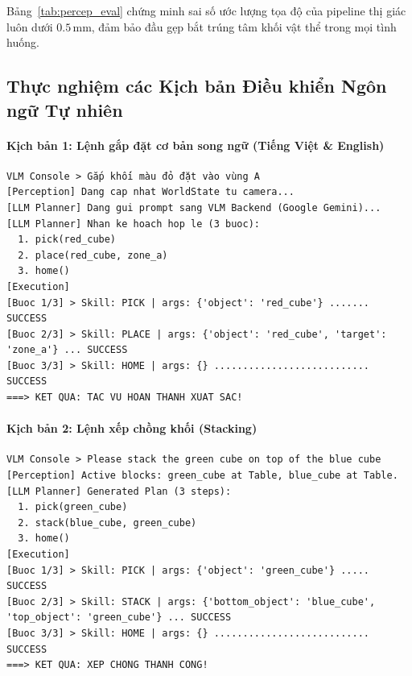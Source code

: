 \documentclass[a4paper,12pt]{article}
\begin{document}
Bảng~\ref{tab:percep_eval} chứng minh sai số ước lượng tọa độ của pipeline thị giác luôn dưới $0.5\,\text{mm}$, đảm bảo đầu gẹp bắt trúng tâm khối vật thể trong mọi tình huống.

\subsection{Thực nghiệm các Kịch bản Điều khiển Ngôn ngữ Tự nhiên}

\paragraph{Kịch bản 1: Lệnh gắp đặt cơ bản song ngữ (Tiếng Việt \& English)}
\begin{lstlisting}
VLM Console > Gắp khối màu đỏ đặt vào vùng A
[Perception] Dang cap nhat WorldState tu camera...
[LLM Planner] Dang gui prompt sang VLM Backend (Google Gemini)...
[LLM Planner] Nhan ke hoach hop le (3 buoc):
  1. pick(red_cube)
  2. place(red_cube, zone_a)
  3. home()
[Execution]
[Buoc 1/3] > Skill: PICK | args: {'object': 'red_cube'} ....... SUCCESS
[Buoc 2/3] > Skill: PLACE | args: {'object': 'red_cube', 'target': 'zone_a'} ... SUCCESS
[Buoc 3/3] > Skill: HOME | args: {} ........................... SUCCESS
===> KET QUA: TAC VU HOAN THANH XUAT SAC!
\end{lstlisting}

\paragraph{Kịch bản 2: Lệnh xếp chồng khối (Stacking)}
\begin{lstlisting}
VLM Console > Please stack the green cube on top of the blue cube
[Perception] Active blocks: green_cube at Table, blue_cube at Table.
[LLM Planner] Generated Plan (3 steps):
  1. pick(green_cube)
  2. stack(blue_cube, green_cube)
  3. home()
[Execution]
[Buoc 1/3] > Skill: PICK | args: {'object': 'green_cube'} ..... SUCCESS
[Buoc 2/3] > Skill: STACK | args: {'bottom_object': 'blue_cube', 'top_object': 'green_cube'} ... SUCCESS
[Buoc 3/3] > Skill: HOME | args: {} ........................... SUCCESS
===> KET QUA: XEP CHONG THANH CONG!
\end{lstlisting}
\end{document}
